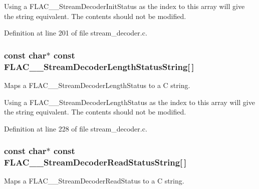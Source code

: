 Using a F\+L\+A\+C\+\_\+\+\_\+\+Stream\+Decoder\+Init\+Status as the index to this array will give the string equivalent. The contents should not be modified. 

Definition at line 201 of file stream\+\_\+decoder.\+c.

\subsubsection[{\texorpdfstring{F\+L\+A\+C\+\_\+\+\_\+\+Stream\+Decoder\+Length\+Status\+String}{FLAC__StreamDecoderLengthStatusString}}]{ {\bf const} char$\ast$ {\bf const} F\+L\+A\+C\+\_\+\+\_\+\+Stream\+Decoder\+Length\+Status\+String\mbox{[}$\,$\mbox{]}}\hypertarget{group__flac__stream__decoder_ga434d91c0bf414d7c432bc6e761bdd55e}{}\label{group__flac__stream__decoder_ga434d91c0bf414d7c432bc6e761bdd55e}
Maps a F\+L\+A\+C\+\_\+\+\_\+\+Stream\+Decoder\+Length\+Status to a C string.

Using a F\+L\+A\+C\+\_\+\+\_\+\+Stream\+Decoder\+Length\+Status as the index to this array will give the string equivalent. The contents should not be modified. 

Definition at line 228 of file stream\+\_\+decoder.\+c.

\subsubsection[{\texorpdfstring{F\+L\+A\+C\+\_\+\+\_\+\+Stream\+Decoder\+Read\+Status\+String}{FLAC__StreamDecoderReadStatusString}}]{ {\bf const} char$\ast$ {\bf const} F\+L\+A\+C\+\_\+\+\_\+\+Stream\+Decoder\+Read\+Status\+String\mbox{[}$\,$\mbox{]}}\hypertarget{group__flac__stream__decoder_gadad9526cb960d7d0ac0ca19124d40b2a}{}\label{group__flac__stream__decoder_gadad9526cb960d7d0ac0ca19124d40b2a}
Maps a F\+L\+A\+C\+\_\+\+\_\+\+Stream\+Decoder\+Read\+Status to a C string.

